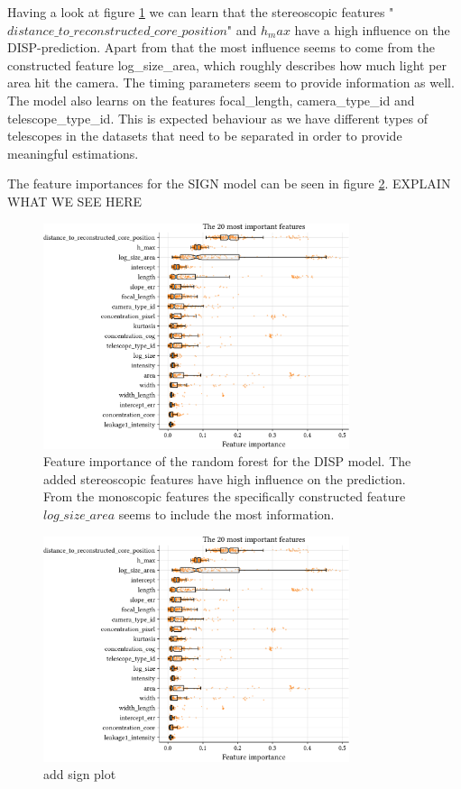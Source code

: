 Having a look at figure \ref{fig:disp_features} we can learn that 
the stereoscopic features "$distance\_to\_reconstructed\_core\_position$"
and $h_max$ have a high influence on the DISP-prediction.
Apart from that the most influence seems to come from the constructed 
feature log\_size\_area, which roughly describes how much light per 
area hit the camera. The timing parameters seem to provide information as 
well. The model also learns on the features focal\_length,  
camera\_type\_id and telescope\_type\_id. This is expected 
behaviour as we have different types of telescopes in the datasets that
need to be separated in order to provide meaningful estimations.

The feature importances for the SIGN model can be seen in figure \ref{fig:sign_features}.
EXPLAIN WHAT WE SEE HERE


\begin{figure}
	\centering
	\includegraphics[width=0.8\textwidth]{../analysis/plots/disp_features.pdf}
	\caption{
	    Feature importance of the random forest for the DISP model.
	    The added stereoscopic features have high influence on the prediction.
    	    From the monoscopic features the specifically constructed feature
    	    $log\_size\_area$ seems to include the most information.}
	\label{fig:disp_features}
\end{figure}

\begin{figure}
	\centering
	\includegraphics[width=0.8\textwidth]{../analysis/plots/disp_features.pdf}
	\caption{add sign plot}
	\label{fig:sign_features}
\end{figure}


